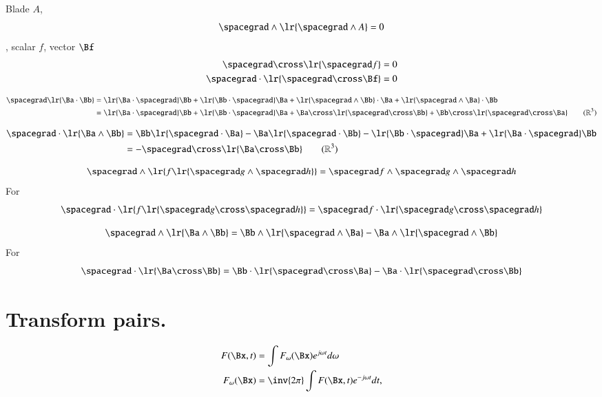 Blade \( A \),
\begin{equation}\label{eqn:helpful:340}
\spacegrad \wedge \lr{ \spacegrad \wedge A } = 0
\end{equation}
, scalar \( f \), vector \( \Bf \)
\begin{equation}\label{eqn:helpful:360}
\begin{aligned}
\spacegrad \cross \lr{ \spacegrad f } &= 0 \\
\spacegrad \cdot \lr{ \spacegrad \cross \Bf } &= 0
\end{aligned}
\end{equation}

\begin{equation}\label{eqn:helpful:380}
\begin{aligned}
\spacegrad \lr{ \Ba \cdot \Bb } &= \lr{ \Ba \cdot \spacegrad } \Bb + \lr{ \Bb \cdot \spacegrad } \Ba + \lr{ \spacegrad \wedge \Bb } \cdot \Ba + \lr{ \spacegrad \wedge \Ba } \cdot \Bb \\
&= \lr{ \Ba \cdot \spacegrad } \Bb + \lr{ \Bb \cdot \spacegrad } \Ba + \Ba \cross \lr{ \spacegrad \cross \Bb } + \Bb \cross \lr{ \spacegrad \cross \Ba } \qquad(\mathbb{R}^3)
\end{aligned}
\end{equation}

\begin{equation}\label{eqn:helpful:400}
\begin{aligned}
\spacegrad \cdot \lr{ \Ba \wedge \Bb }
&= \Bb \lr{ \spacegrad \cdot \Ba } - \Ba \lr{ \spacegrad \cdot \Bb } - \lr{ \Bb \cdot \spacegrad } \Ba + \lr{ \Ba \cdot \spacegrad } \Bb \\
&= -\spacegrad \cross \lr{ \Ba \cross \Bb }\qquad(\mathbb{R}^3)
\end{aligned}
\end{equation}


\begin{equation}\label{eqn:helpful:420}
\spacegrad \wedge \lr{ f \lr{ \spacegrad g \wedge \spacegrad h } } = \spacegrad f \wedge \spacegrad g \wedge \spacegrad h
\end{equation}
For 
\begin{equation}\label{eqn:helpful:440}
\spacegrad \cdot \lr{ f \lr{ \spacegrad g \cross \spacegrad h } } = \spacegrad f \cdot \lr{ \spacegrad g \cross \spacegrad h }
\end{equation}

\begin{equation}\label{eqn:helpful:460}
\spacegrad \wedge \lr{ \Ba \wedge \Bb } = \Bb \wedge \lr{ \spacegrad \wedge \Ba } - \Ba \wedge \lr{ \spacegrad \wedge \Bb }
\end{equation}
For 
\begin{equation}\label{eqn:helpful:480}
\spacegrad \cdot \lr{ \Ba \cross \Bb } = \Bb \cdot \lr{ \spacegrad \cross \Ba } - \Ba \cdot \lr{ \spacegrad \cross \Bb }
\end{equation}

\section{Transform pairs.}
\begin{equation}\label{eqn:helpful:500}
\begin{aligned}
F(\Bx, t) &= \int F_\omega(\Bx) e^{j \omega t} d\omega \\
F_\omega(\Bx) &= \inv{2 \pi} \int F(\Bx, t) e^{-j \omega t} dt,
\end{aligned}
\end{equation}
